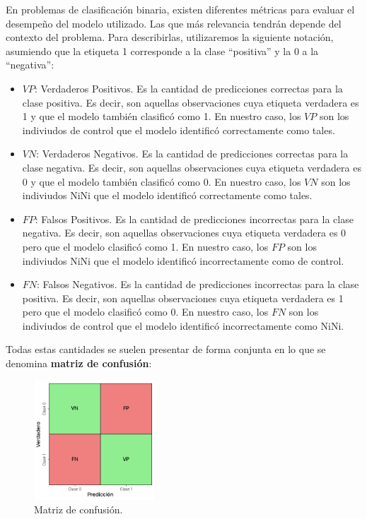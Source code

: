 \documentclass[../../main.tex]{subfiles}
\begin{document}
En problemas de clasificación binaria, existen diferentes métricas para evaluar el
desempeño del modelo utilizado. Las que más relevancia tendrán depende del contexto del
problema. Para describirlas, utilizaremos la siguiente notación, asumiendo que la etiqueta
1 corresponde a la clase ``positiva'' y la 0 a la ``negativa'':
\begin{itemize}
    \item \(VP\): Verdaderos Positivos. Es la cantidad de predicciones correctas para la
    clase positiva. Es decir, son aquellas observaciones cuya etiqueta verdadera es 1 y
    que el modelo también clasificó como 1. En nuestro caso, los \(VP\) son los indiviudos
    de control que el modelo identificó correctamente como tales.
    \item \(VN\): Verdaderos Negativos. Es la cantidad de predicciones correctas para la
    clase negativa. Es decir, son aquellas observaciones cuya etiqueta verdadera es 0 y
    que el modelo también clasificó como 0. En nuestro caso, los \(VN\) son los indiviudos
    NiNi que el modelo identificó correctamente como tales.
    \item \(FP\): Falsos Positivos. Es la cantidad de predicciones incorrectas para la
    clase negativa. Es decir, son aquellas observaciones cuya etiqueta verdadera es 0 pero
    que el modelo clasificó como 1. En nuestro caso, los \(FP\) son los indiviudos NiNi
    que el modelo identificó incorrectamente como de control.
    \item \(FN\): Falsos Negativos. Es la cantidad de predicciones incorrectas para la
    clase positiva. Es decir, son aquellas observaciones cuya etiqueta verdadera es 1 pero
    que el modelo clasificó como 0. En nuestro caso, los \(FN\) son los indiviudos de
    control que el modelo identificó incorrectamente como NiNi.
\end{itemize}

Todas estas cantidades se suelen presentar de forma conjunta en lo que se denomina
\textbf{matriz de confusión}:

\begin{figure}[h!]
    \centering
    \includegraphics[width=0.4\textwidth]{figs/matriz-confusion.png}
    \caption{Matriz de confusión.}
    \label{fig:confusion-matrix}
\end{figure}
\end{document}
